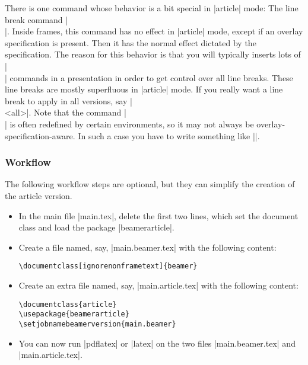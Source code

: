 There is one command whose behavior is a bit special in |article| mode: The line break command |\\|. Inside frames, this command has no effect in |article| mode, except if an overlay specification is present. Then it has the normal effect dictated by the specification. The reason for this behavior is that you will typically inserts lots of |\\| commands in a presentation in order to get control over all line breaks. These line breaks are mostly superfluous in |article| mode. If you really want a line break to apply in all versions, say |\\<all>|. Note that the command |\\| is often redefined by certain environments, so it may not always be overlay-specification-aware. In such a case you have to write something like ||.

\subsubsection{Workflow}
\label{section-article-version-workflow}

The following workflow steps are optional, but they can simplify the creation of the article version.

\begin{itemize}
\item
  In the main file |main.tex|, delete the first two lines, which set the
  document class and load the package |beamerarticle|.
\item
  Create a file named, say, |main.beamer.tex| with the following content:

\begin{verbatim}
\documentclass[ignorenonframetext]{beamer}

\end{verbatim}

\item
  Create an extra file named, say, |main.article.tex| with the following content:

\begin{verbatim}
\documentclass{article}
\usepackage{beamerarticle}
\setjobnamebeamerversion{main.beamer}

\end{verbatim}

\item
  You can now run |pdflatex| or |latex| on the two files |main.beamer.tex| and |main.article.tex|.
\end{itemize}


